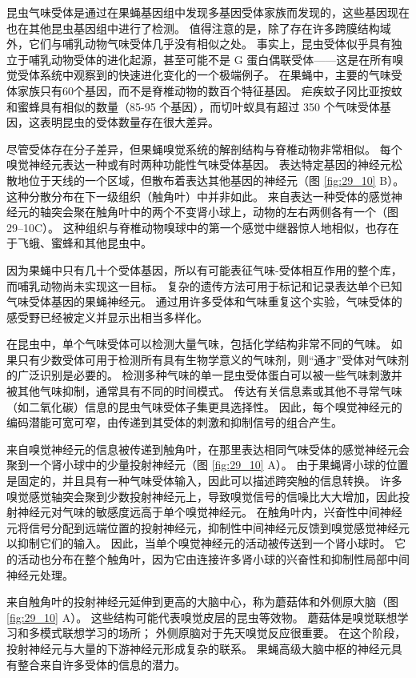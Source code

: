 昆虫气味受体是通过在果蝇基因组中发现多基因受体家族而发现的，这些基因现在也在其他昆虫基因组中进行了检测。 值得注意的是，除了存在许多跨膜结构域外，它们与哺乳动物气味受体几乎没有相似之处。 事实上，昆虫受体似乎具有独立于哺乳动物受体的进化起源，甚至可能不是 G 蛋白偶联受体——这是在所有嗅觉受体系统中观察到的快速进化变化的一个极端例子。 在果蝇中，主要的气味受体家族只有60个基因，而不是脊椎动物的数百个特征基因。 疟疾蚊子冈比亚按蚊和蜜蜂具有相似的数量（85-95 个基因），而切叶蚁具有超过 350 个气味受体基因，这表明昆虫的受体数量存在很大差异。

尽管受体存在分子差异，但果蝇嗅觉系统的解剖结构与脊椎动物非常相似。 每个嗅觉神经元表达一种或有时两种功能性气味受体基因。 表达特定基因的神经元松散地位于天线的一个区域，但散布着表达其他基因的神经元（图 \ref{fig:29_10} B）。 这种分散分布在下一级组织（触角叶）中并非如此。 来自表达一种受体的感觉神经元的轴突会聚在触角叶中的两个不变肾小球上，动物的左右两侧各有一个（图 29–10C）。 这种组织与脊椎动物嗅球中的第一个感觉中继器惊人地相似，也存在于飞蛾、蜜蜂和其他昆虫中。

因为果蝇中只有几十个受体基因，所以有可能表征气味-受体相互作用的整个库，而哺乳动物尚未实现这一目标。 复杂的遗传方法可用于标记和记录表达单个已知气味受体基因的果蝇神经元。 通过用许多受体和气味重复这个实验，气味受体的感受野已经被定义并显示出相当多样化。

在昆虫中，单个气味受体可以检测大量气味，包括化学结构非常不同的气味。 如果只有少数受体可用于检测所有具有生物学意义的气味剂，则“通才”受体对气味剂的广泛识别是必要的。 检测多种气味的单一昆虫受体蛋白可以被一些气味刺激并被其他气味抑制，通常具有不同的时间模式。 传达有关信息素或其他不寻常气味（如二氧化碳）信息的昆虫气味受体子集更具选择性。 因此，每个嗅觉神经元的编码潜能可宽可窄，由传递到其受体的刺激和抑制信号的组合产生。

来自嗅觉神经元的信息被传递到触角叶，在那里表达相同气味受体的感觉神经元会聚到一个肾小球中的少量投射神经元（图 \ref{fig:29_10} A）。 由于果蝇肾小球的位置是固定的，并且具有一种气味受体输入，因此可以描述跨突触的信息转换。 许多嗅觉感觉轴突会聚到少数投射神经元上，导致嗅觉信号的信噪比大大增加，因此投射神经元对气味的敏感度远高于单个嗅觉神经元。 在触角叶内，兴奋性中间神经元将信号分配到远端位置的投射神经元，抑制性中间神经元反馈到嗅觉感觉神经元以抑制它们的输入。 因此，当单个嗅觉神经元的活动被传送到一个肾小球时。 它的活动也分布在整个触角叶，因为它由连接许多肾小球的兴奋性和抑制性局部中间神经元处理。

来自触角叶的投射神经元延伸到更高的大脑中心，称为蘑菇体和外侧原大脑（图 \ref{fig:29_10} A）。 这些结构可能代表嗅觉皮层的昆虫等效物。 蘑菇体是嗅觉联想学习和多模式联想学习的场所； 外侧原脑对于先天嗅觉反应很重要。 在这个阶段，投射神经元与大量的下游神经元形成复杂的联系。 果蝇高级大脑中枢的神经元具有整合来自许多受体的信息的潜力。


